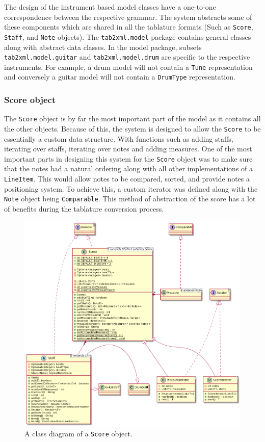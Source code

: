 \documentclass[11pt]{article}
\begin{document}
The design of the instrument based model classes have a one-to-one correspondence between the respective grammar. The system abstracts some of these components which are shared in all the tablature formats (Such as \texttt{Score}, \texttt{Staff}, and \texttt{Note} objects). The \texttt{tab2xml.model} package contains general classes along with abstract data classes. In the model package, subsets \texttt{tab2xml.model.guitar} and \texttt{tab2xml.model.drum} are specific to the respective instruments. For example, a drum model will not contain a \texttt{Tune} representation and conversely a guitar model will not contain a \texttt{DrumType} representation.

\subsubsection{Score object}
\label{sec:orge2b79c3}
The \texttt{Score} object is by far the most important part of the model as it contains all the other objects. Because of this, the system is designed to allow the \texttt{Score} to be essentially a custom data structure. With functions such as adding staffs, iterating over staffs, iterating over notes and adding measures. One of the most important parts in designing this system for the \texttt{Score} object was to make sure that the notes had a natural ordering along with all other implementations of a \texttt{LineItem}. This would allow notes to be compared, sorted, and provide notes a positioning system. To achieve this, a custom iterator was defined along with the \texttt{Note} object being \texttt{Comparable}. This method of abstraction of the score has a lot of benefits during the tablature conversion process.
\begin{figure}[htbp]
\centering
\includegraphics[width=.9\linewidth]{./Diagrams/backend-score-diagram.png}
\caption{A class diagram of a \texttt{Score} object.}
\end{figure}
\end{document}
